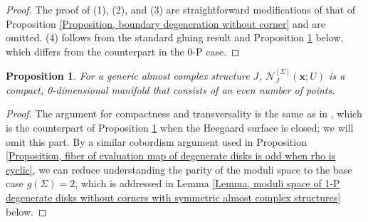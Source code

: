 \documentclass{amsart}
\newtheorem{prop}[thm]{Proposition}
\theoremstyle{definition}
\theoremstyle{remark}
\numberwithin{equation}{section}
\numberwithin{equation}{section} \makeatletter
\begin{document}
\begin{proof} 
The proof of (1), (2), and (3) are straightforward modifications of that of Proposition \ref{Proposition, boundary degeneration without corner} and are omitted. (4) follows from the standard gluing result and Proposition \ref{Proposition, 1-P degenerate disks without corner appear in pairs} below, which differs from the counterpart in the 0-P case.  
\end{proof}

\begin{prop}\label{Proposition, 1-P degenerate disks without corner appear in pairs}
For a generic almost complex structure $J$, $\mathcal{N}^{[\Sigma]}_J(\bm{x};U)$ is a compact, 0-dimensional manifold that consists of an even number of points. 
\end{prop}
\begin{proof}
The argument for compactness and transversality is the same as in \cite[Proposition 3.14]{OS04}, which is the counterpart of Proposition \ref{Proposition, 1-P degenerate disks without corner appear in pairs} when the Heegaard surface is closed; we will omit this part. By a similar cobordism argument used in Proposition \ref{Proposition, fiber of evaluation map of degenerate disks is odd when rho is cyclic}, we can reduce understanding the parity of the moduli space to the base case $g(\Sigma)=2$, which is addressed in Lemma \ref{Lemma, moduli space of 1-P degenerate disks without corners with symmetric almost complex structures} below.
\end{proof}
\end{document}
